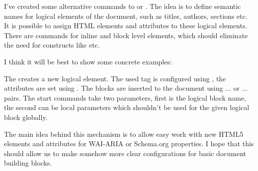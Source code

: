I've created some alternative commands to \texcommand{\HCode} or \texcommand{\Tg}. The idea is to define
semantic names for logical elements of the document, such as titles, authors,
sections etc. It is possible to assign HTML elements and attributes to these
logical elements. There are commands for inline and block level elements,
which should eliminate the need for constructs like \texcommand{\ifvmode\IgnorePar\fi\EndP}
etc.

I think it will be best to show some concrete examples:


\begin{texsource}



{\NoFonts{}}
{\EndNoFonts}

{}
{\NoFonts{}}
{\EndNoFonts}
\end{texsource}



The \texcommand{\NewLogicalBlock} creates a new logical element. The used tag is configured
using \texcommand{\SetTag}, the attributes are set using \texcommand{\SetBlockProperty}. The blocks are
inserted to the document using \texcommand{\InlineElementStart} ...  \texcommand{\InlineElementEnd} or
\texcommand{\BlockElementStart} ... \texcommand{\BlockElementEnd} pairs. The start commands take two
parameters, first is the logical block name, the second can be local
parameters which shouldn't be used for the given logical block globally.

The main idea behind this mechanism is to allow easy work with new HTML5
elements and attributes for WAI-ARIA or Schema.org properties. I hope that
this should allow us to make somehow more clear configurations for basic
document building blocks.
